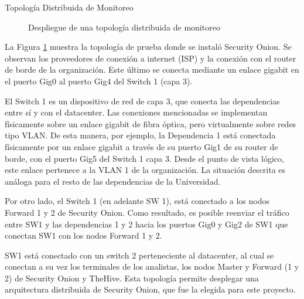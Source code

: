 \begin{subsection}{Topología Distribuida de Monitoreo}
\begin{figure}[H]
    \caption{Despliegue de una topología distribuida de monitoreo}
    \label{fig:iter1_top_d_unc}
    \end{figure}
    La Figura \ref{fig:iter1_top_d_unc} muestra la topología de prueba donde se instaló Security Onion. Se observan los proveedores de conexión a internet (ISP) y la conexión con el router de borde de la organización. Este último se conecta mediante un enlace gigabit en el puerto Gig0 al puerto Gig4 del Switch 1 (capa 3). \par
    El Switch 1 es un dispositivo de red de capa 3, que conecta las dependencias entre sí y con el datacenter. Las conexiones mencionadas se implementan físicamente sobre un enlace gigabit de fibra óptica, pero virtualmente sobre redes tipo VLAN. De esta manera, por ejemplo, la Dependencia 1 está conectada físicamente por un enlace gigabit a través de su puerto Gig1 de su router de borde, con el puerto Gig5 del Switch 1 capa 3. Desde el punto de vista lógico, este enlace pertenece a la VLAN 1 de la organización. La situación descrita es análoga para el resto de las dependencias de la Universidad. \par
    Por otro lado, el Switch 1 (en adelante SW 1), está conectado a los nodos Forward 1 y 2 de Security Onion. Como resultado, es posible reenviar el tráfico entre SW1 y las dependencias 1 y 2 hacia los puertos Gig0 y Gig2 de SW1 que conectan SW1 con los nodos Forward 1 y 2. \par
    SW1 está conectado con un switch 2 perteneciente al datacenter, al cual se conectan a su vez los terminales de los analistas, los nodos Master y Forward (1 y 2) de Security Onion y TheHive. Esta topología permite desplegar una arquitectura distribuida de Security Onion, que fue la elegida para este proyecto.
    \end{subsection}
